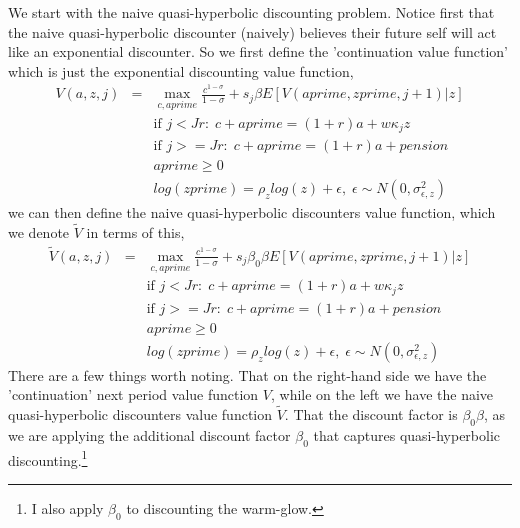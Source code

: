We start with the naive quasi-hyperbolic discounting problem. Notice first that the naive quasi-hyperbolic discounter (naively) believes their future self will act like an exponential discounter. So we first define the 'continuation value function' which is just the exponential discounting value function,
\begin{eqnarray*}
 V(a,z,j)&=& \max_{c,aprime} \frac{c^{1-\sigma}}{1-\sigma}+ s_j \beta E[V(aprime,zprime,j+1)|z] \\
&& \text{if }j<Jr: \; c+aprime=(1+r)a+w \kappa_j z\\
&& \text{if }j>=Jr: \; c+aprime=(1+r)a +pension\\
&& aprime\geq 0 \\
&& log(zprime)=\rho_z log(z) + \epsilon, \; \epsilon \sim N(0,\sigma_{\epsilon,z}^2)
\end{eqnarray*}
we can then define the naive quasi-hyperbolic discounters value function, which we denote $\tilde{V}$ in terms of this,
\begin{eqnarray*}
 \tilde{V}(a,z,j)&=& \max_{c,aprime} \frac{c^{1-\sigma}}{1-\sigma} + s_j \beta_0 \beta E[V(aprime,zprime,j+1)|z] \\
&& \text{if }j<Jr: \; c+aprime=(1+r)a+w \kappa_j z\\
&& \text{if }j>=Jr: \; c+aprime=(1+r)a +pension\\
&& aprime\geq 0 \\
&& log(zprime)=\rho_z log(z) + \epsilon, \; \epsilon \sim N(0,\sigma_{\epsilon,z}^2)
\end{eqnarray*}
There are a few things worth noting. That on the right-hand side we have the 'continuation' next period value function $V$, while on the left we have the naive quasi-hyperbolic discounters value function $\tilde{V}$. That the discount factor is $\beta_0 \beta$, as we are applying the additional discount factor $\beta_0$ that captures quasi-hyperbolic discounting.\footnote{I also apply $\beta_0$ to discounting the warm-glow.}

